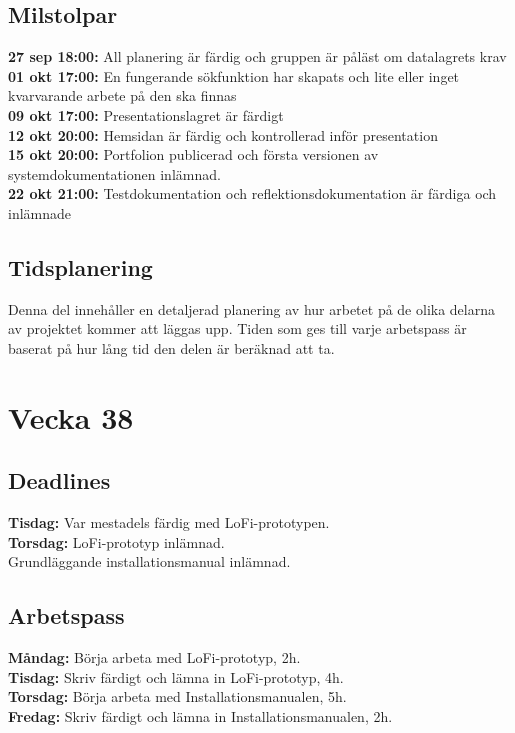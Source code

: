 \documentclass{TDP003mall}
\begin{document}
\subsection{Milstolpar}
\textbf{27 sep 18:00:} All planering är färdig och gruppen är påläst om datalagrets krav\\
\textbf{01 okt 17:00:} En fungerande sökfunktion har skapats och lite eller inget kvarvarande arbete på den ska finnas\\
\textbf{09 okt 17:00:} Presentationslagret är färdigt\\
\textbf{12 okt 20:00:} Hemsidan är färdig och kontrollerad inför presentation\\
\textbf{15 okt 20:00:} Portfolion publicerad och första versionen av systemdokumentationen inlämnad.\\
\textbf{22 okt 21:00:} Testdokumentation och reflektionsdokumentation är färdiga och inlämnade\\ 

\subsection{Tidsplanering}
Denna del innehåller en detaljerad planering av hur arbetet på de olika delarna av projektet kommer att läggas upp. Tiden som ges till varje arbetspass är baserat på hur lång tid den delen är beräknad att ta. 
\section*{Vecka 38}

\subsection*{Deadlines}
\textbf{Tisdag: }Var mestadels färdig med LoFi-prototypen.\\
\textbf{Torsdag: }LoFi-prototyp inlämnad.\\
\-\hspace{47pt}Grundläggande installationsmanual inlämnad.

\subsection*{Arbetspass}
\textbf{Måndag: }Börja arbeta med LoFi-prototyp, 2h.\\
\textbf{Tisdag: }Skriv färdigt och lämna in LoFi-prototyp, 4h. \\
\textbf{Torsdag: }Börja arbeta med Installationsmanualen, 5h.\\
\textbf{Fredag: }Skriv färdigt och lämna in Installationsmanualen, 2h.
\end{document}
